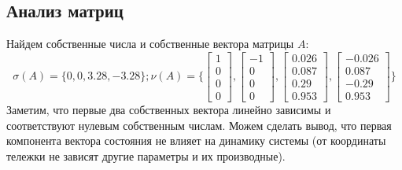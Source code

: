\subsection{Анализ матриц}
Найдем собственные числа и собственные вектора матрицы $A$:
\begin{equation*}
    \sigma(A) = \{0, 0, 3.28, -3.28\}; \nu(A) = \{\begin{bmatrix}
        1 \\ 0 \\ 0 \\ 0
    \end{bmatrix},
    \begin{bmatrix}
        -1 \\ 0 \\ 0 \\ 0
    \end{bmatrix},
    \begin{bmatrix}
        0.026 \\ 0.087 \\ 0.29 \\ 0.953
    \end{bmatrix},
    \begin{bmatrix}
        -0.026 \\ 0.087 \\ -0.29 \\ 0.953
    \end{bmatrix}\}
\end{equation*}
Заметим, что первые два собственных вектора линейно зависимы и соответствуют нулевым собственным числам. Можем сделать вывод,
что первая компонента вектора состояния не влияет на динамику системы (от координаты тележки не зависят другие параметры и их производные).

